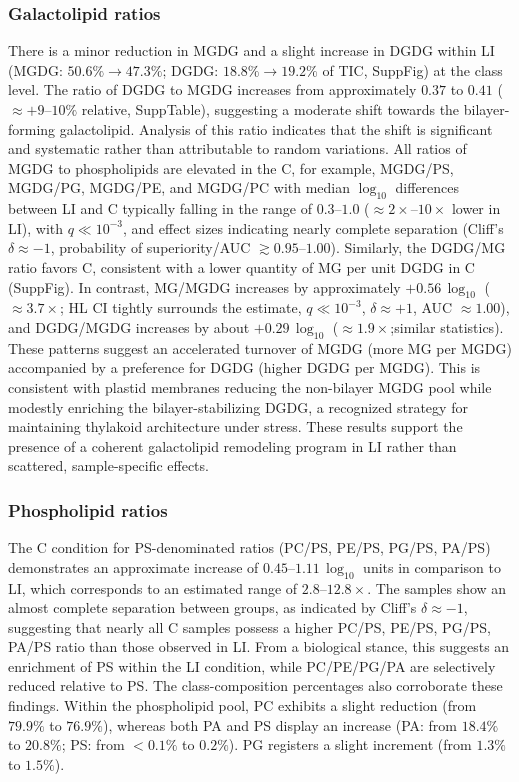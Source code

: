 \documentclass[10pt,letterpaper]{article}
\begin{document}
\subsubsection*{Galactolipid ratios} 
There is a minor reduction in MGDG and a slight increase in DGDG within LI (MGDG: $50.6\% \rightarrow 47.3\%$; DGDG: $18.8\% \rightarrow 19.2\%$ of TIC, SuppFig) at the class level. The ratio of DGDG to MGDG increases from approximately $0.37$ to $0.41$ ($\approx +9$--$10\%$ relative, SuppTable), suggesting a moderate shift towards the bilayer-forming galactolipid. Analysis of this ratio indicates that the shift is significant and systematic rather than attributable to random variations. All ratios of MGDG to phospholipids are elevated in the C, for example, MGDG/PS, MGDG/PG, MGDG/PE, and  MGDG/PC with median $\log_{10}$ differences between LI and C typically falling in the range of $0.3$–$1.0$ ($\approx 2\times$–$10\times$ lower in LI), with $q \ll 10^{-3}$, and effect sizes indicating nearly complete separation (Cliff’s $\delta \approx -1$, probability of superiority/AUC $\gtrsim 0.95$–$1.00$). Similarly, the DGDG/MG ratio favors C, consistent with a lower quantity of MG per unit DGDG in C (SuppFig). In contrast, MG/MGDG increases by approximately $+0.56 \,\log_{10}$ ($\approx 3.7\times$; HL CI tightly surrounds the estimate, $q \ll 10^{-3}$, $\delta \approx +1$, AUC $\approx 1.00$), and DGDG/MGDG increases by about $+0.29 \,\log_{10}$ ($\approx 1.9\times$;similar statistics). These patterns suggest an accelerated turnover of MGDG (more MG per MGDG) accompanied by a preference for DGDG (higher DGDG per MGDG). This is consistent with plastid membranes reducing the non-bilayer MGDG pool while modestly enriching the bilayer-stabilizing DGDG, a recognized strategy for maintaining thylakoid architecture under stress. These results support the presence of a coherent galactolipid remodeling program in LI rather than scattered, sample-specific effects.


\subsubsection*{Phospholipid ratios}
The C condition for PS-denominated ratios (PC/PS, PE/PS, PG/PS, PA/PS) demonstrates an approximate increase of $0.45$–$1.11 \,\log_{10}$ units in comparison to LI, which corresponds to an estimated range of $2.8$–$12.8\times$. The samples show an almost complete separation between groups, as indicated by Cliff’s $\delta \approx -1$, suggesting that nearly all C samples possess a higher PC/PS, PE/PS, PG/PS, PA/PS ratio than those observed in LI. From a biological stance, this suggests an enrichment of PS within the LI condition, 
while PC/PE/PG/PA are selectively reduced relative to PS. The class-composition percentages also corroborate these findings. Within the phospholipid pool, PC exhibits a slight reduction (from $79.9\%$ to $76.9\%$), whereas both PA and PS display an increase (PA: from $18.4\%$ to $20.8\%$; PS: from $<0.1\%$ to $0.2\%$). PG registers a slight increment (from $1.3\%$ to $1.5\%$). 
\end{document}
